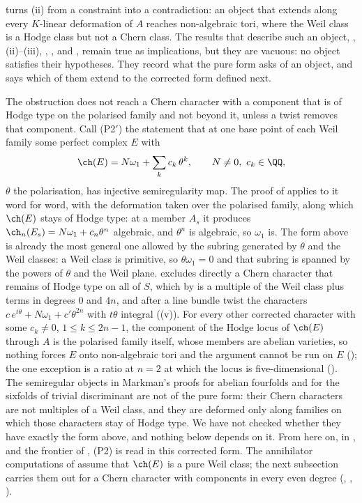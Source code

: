 \begin{remark}\label{rem:p2prime}
 turns (ii) from a constraint into a
contradiction: an object that extends along every $K$-linear deformation of
$A$ reaches non-algebraic tori, where the Weil class is a Hodge class but not
a Chern class. The results that describe such an object,
, (ii)--(iii), ,
,  and , remain true as
implications, but they are vacuous: no object satisfies their hypotheses.
They record what the pure form asks of an object, and
 says which of them extend to the corrected form
defined next.

The obstruction does not reach a Chern character with a component that is of
Hodge type on the polarised family and not beyond it, unless a twist removes
that component. Call
\textup{(P2$'$)} the statement that at one base point of each Weil family
some perfect complex $E$ with
\[
  \ch(E)=N\omega_{1}+\sum_{k}c_{k}\,\theta^{k},\qquad N\ne0,\ c_{k}\in\QQ,
\]
$\theta$ the polarisation, has injective semiregularity map. The proof of
 applies to it word for word, with the deformation
taken over the polarised family, along which $\ch(E)$ stays of Hodge type:
at a member $A_{s}$ it produces $\ch_{n}(E_{s})=N\omega_{1}+c_{n}\theta^{n}$
algebraic, and $\theta^{n}$ is algebraic, so $\omega_{1}$ is. The form above
is already the most general one allowed by the subring generated by $\theta$
and the Weil classes: a Weil class is primitive, so $\theta\omega_{1}=0$ and
that subring is spanned by the powers of $\theta$ and the Weil plane.
 excludes directly a Chern character that remains of Hodge
type on all of $S$, which by  is a multiple of the
Weil class plus terms in degrees $0$ and $4n$, and after a line bundle twist
the characters $c\,e^{t\theta}+N\omega_{1}+c'\theta^{2n}$ with $t\theta$
integral ((v)). For every other corrected character
with some $c_{k}\ne0$, $1\le k\le2n-1$, the component of the Hodge locus of
$\ch(E)$ through $A$ is the polarised family itself, whose members are
abelian varieties, so nothing forces $E$ onto non-algebraic tori and the
argument cannot be run on $E$ (); the one exception is
a ratio at $n=2$ at which the locus is five-dimensional
(). The semiregular objects in Markman's
proofs for abelian fourfolds and for the sixfolds of trivial discriminant
\cite{Mar25a,Mar25b} are not of the pure form: their Chern characters are not
multiples of a Weil class, and they are deformed only along families on which
those characters stay of Hodge type. We have not checked whether they have
exactly the form above, and nothing below depends on it. From here on, in
,  and the frontier of
, \textup{(P2)} is read in this corrected form. The
annihilator computations of  assume that $\ch(E)$ is a
pure Weil class; the next subsection carries them out for a Chern character
with components in every even degree (,
, ).


\end{remark}
